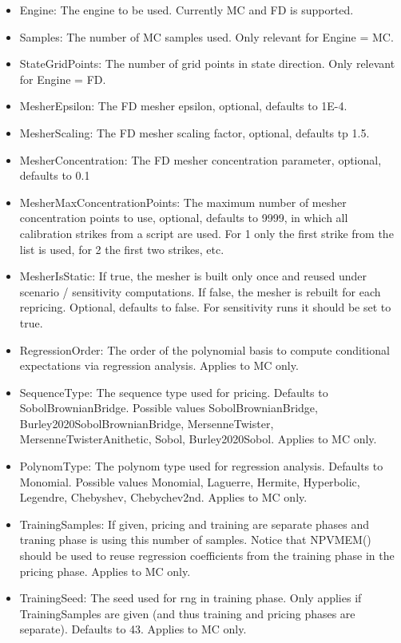 \begin{itemize}
\item Engine: The engine to be used. Currently MC and FD is supported.
\item Samples: The number of MC samples used. Only relevant for Engine = MC.
\item StateGridPoints: The number of grid points in state direction. Only relevant for Engine = FD.
\item MesherEpsilon: The FD mesher epsilon, optional, defaults to 1E-4.
\item MesherScaling: The FD mesher scaling factor, optional, defaults tp 1.5.
\item MesherConcentration: The FD mesher concentration parameter, optional, defaults to 0.1
\item MesherMaxConcentrationPoints: The maximum number of mesher concentration points to use, optional, defaults to
  9999, in which all calibration strikes from a script are used. For 1 only the first strike from the list is used, for
  2 the first two strikes, etc.
\item MesherIsStatic: If true, the mesher is built only once and reused under scenario / sensitivity computations. If
  false, the mesher is rebuilt for each repricing. Optional, defaults to false. For sensitivity runs it should be set to
  true.
\item RegressionOrder: The order of the polynomial basis to compute conditional expectations via regression
  analysis. Applies to MC only.
\item SequenceType: The sequence type used for pricing. Defaults to SobolBrownianBridge. Possible values
  SobolBrownianBridge, Burley2020SobolBrownianBridge, MersenneTwister, MersenneTwisterAnithetic, Sobol,
  Burley2020Sobol. Applies to MC only.
\item PolynomType: The polynom type used for regression analysis. Defaults to Monomial. Possible values Monomial,
  Laguerre, Hermite, Hyperbolic, Legendre, Chebyshev, Chebychev2nd. Applies to MC only.
\item TrainingSamples: If given, pricing and training are separate phases and traning phase is using this number of
  samples. Notice that NPVMEM() should be used to reuse regression coefficients from the training phase in the pricing
  phase. Applies to MC only.
\item TrainingSeed: The seed used for rng in training phase. Only applies if TrainingSamples are given (and thus
  training and pricing phases are separate). Defaults to 43. Applies to MC only.

\end{itemize}
